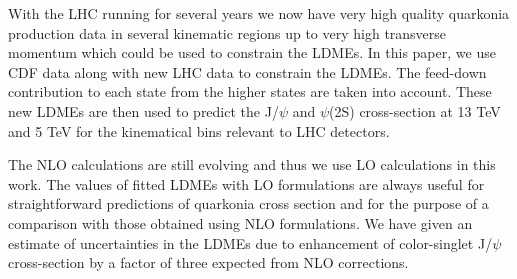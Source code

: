 \documentclass[12pt,a4paper,final]{iopart}
\begin{document}
 With the LHC running for several years we now have very high quality quarkonia 
production data in several kinematic regions up to very high transverse momentum 
which could be used to constrain the LDMEs. In this paper, we use CDF data
\cite{Abe:1997yz,Abe:1997jz,Acosta:2004yw,Abulencia:2007bra} along with new LHC data 
\cite{Chatrchyan:2011kc,Khachatryan:2015rra,Chatrchyan:2012ub,Aad:2015duc,ATLAS:2014ala,
Aaij:2012ag,Aaij:2011jh,Aaij:2015rla,Aaij:2013dja} to constrain 
the LDMEs. 
 The feed-down contribution to each state from the higher states are taken into account.
These new LDMEs are then used to predict the J/$\psi$ and $\psi$(2S)
cross-section at 13 TeV and 5 TeV for the kinematical bins relevant to LHC detectors.

 The NLO calculations are still evolving and thus we use LO calculations in 
this work. The values of fitted LDMEs with LO formulations are always useful 
for straightforward predictions of quarkonia cross section and for the 
purpose of a comparison with those obtained using NLO formulations.
{\color{black}
We have given an estimate of uncertainties in the LDMEs due to enhancement of 
color-singlet J/$\psi$ cross-section by a factor of three expected from NLO 
corrections.
}













\end{document}

